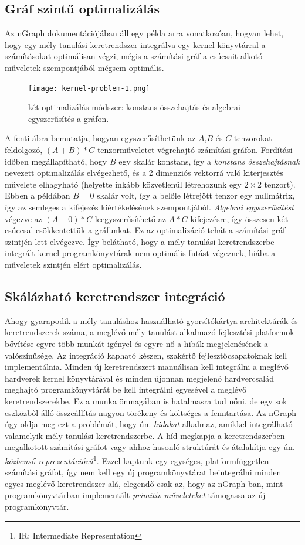 \subsection{Gráf szintű optimalizálás}
Az nGraph dokumentációjában áll egy példa arra vonatkozóan, hogyan lehet, hogy egy mély tanulási keretrendszer integrálva egy {kernel könyvtárral} a számításokat optimálisan végzi, mégis a számítási gráf a csúcsait alkotó műveletek szempontjából mégsem optimális.
\begin{figure}[!ht]
	\centering
	\texttt{[image: kernel-problem-1.png]}
	\caption{két optimalizálás módszer: konstans összehajtás és algebrai egyszerűsítés a gráfon. \protect \footnotemark}
	\label{fig:grafoptimalizalas}
\end{figure}
A fenti ábra bemutatja, hogyan egyszerűsíthetünk az $A$,$B$ és $C$ tenzorokat feldolgozó, $ (A+B)*C $ tenzorműveletet végrehajtó számítási gráfon.
Fordítási időben megállapítható, hogy $B$ egy skalár konstans, így a \emph{konstans összehajtásnak} nevezett optimalizálás elvégezhető, és a 2 dimenziós vektorrá való kiterjesztés művelete elhagyható (helyette inkább közvetlenül létrehozunk egy $2\times2$ tenzort).
Ebben a példában $B=0$ skalár volt, így a belőle létrejött tenzor egy nullmátrix, így az semleges a kifejezés kiértékelésének szempontjából.
\emph{Algebrai egyszerűsítést} végezve az $ (A+0)*C $ leegyszerűsíthető az $A*C$ kifejezésre, így összesen két csúccsal csökkentettük a gráfunkat.
Ez az optimalizáció tehát a számítási gráf szintjén lett elvégezve.
Így belátható, hogy a mély tanulási keretrendszerbe integrált kernel programkönyvtárak nem optimális futást végeznek, hiába a műveletek szintjén elért optimalizálás.

\subsection{Skálázható keretrendszer integráció}
Ahogy gyarapodik a mély tanuláshoz használható gyorsítókártya architektúrák és keretrendszerek száma, a meglévő mély tanulást alkalmazó fejlesztési platformok bővítése egyre több munkát igényel és egyre nő a hibák megjelenésének a valószínűsége. Az integráció kapható készen, szakértő fejlesztőcsapatoknak kell implementálnia.
Minden új keretrendszert manuálisan kell integrálni a meglévő hardverek kernel könyvtárával és minden újonnan megjelenő hardvercsalád meghajtó programkönyvtárát be kell integrálni egyesével a meglévő keretrendszerekbe.
Ez a munka önmagában is hatalmasra tud nőni, de egy sok eszközből álló összeállítás nagyon törékeny és költséges a fenntartása.
Az nGraph úgy oldja meg ezt a problémát, hogy ún. \emph{hidakat} alkalmaz, amikkel integrálható valamelyik mély tanulási keretrendszerbe.
A híd megkapja a keretrendszerben megalkotott számítási gráfot vagy ahhoz hasonló struktúrát és átalakítja egy ún. \emph{közbenső reprezentációvá}\footnote{IR: Intermediate Representation}. Ezzel kaptunk egy egységes, platformfüggetlen számítási gráfot, így nem kell egy új programkönyvtárat beintegrálni minden egyes meglévő keretrendszer alá, elegendő csak az, hogy az nGraph-ban, mint programkönyvtárban implementált \emph{primitív műveleteket} támogassa az új programkönyvtár.

